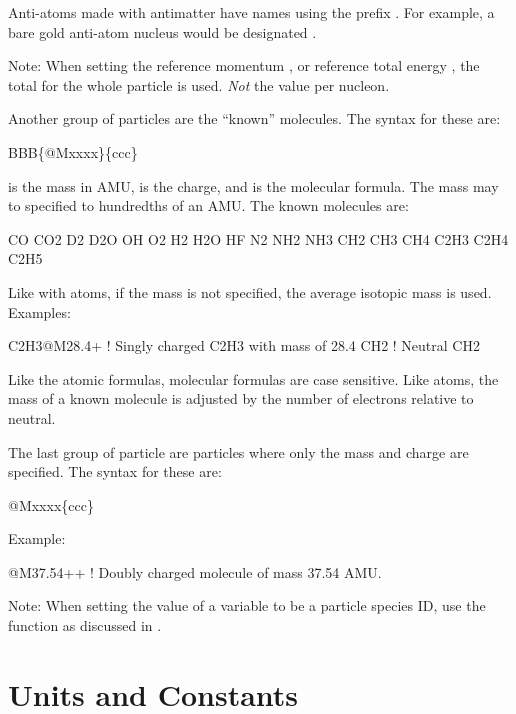 {{{{{Anti-atoms made with antimatter have names using the prefix . For example, a bare
gold anti-atom nucleus would be designated .

Note: When setting the reference momentum , or reference total energy
, the total for the whole particle is used. {\em Not} the value per nucleon.

Another group of particles are the ``known'' molecules. The syntax for these are:
\begin{example}
  BBB\{@Mxxxx\}\{ccc\}
\end{example}
 is the mass in AMU,  is the charge, and  is the molecular formula. The
mass may to specified to hundredths of an AMU. The known molecules are:
\begin{example}
  CO       CO2      
  D2       D2O      
  OH       O2      
  H2       H2O      HF
  N2       NH2      NH3      
  CH2      CH3      CH4      
  C2H3     C2H4     C2H5
\end{example}
Like with atoms, if the mass is not specified, the average isotopic mass is used. Examples:
\begin{example}
  C2H3@M28.4+     ! Singly charged C2H3 with mass of 28.4
  CH2             ! Neutral CH2
\end{example}
Like the atomic formulas, molecular formulas are case sensitive. Like atoms, the mass of a known molecule
is adjusted by the number of electrons relative to neutral.

The last group of particle are particles where only the mass and charge are specified.  The syntax
for these are:
\begin{example}
  @Mxxxx\{ccc\}
\end{example}
Example:
\begin{example}
  @M37.54++    ! Doubly charged molecule of mass 37.54 AMU.
\end{example}

Note: When setting the value of a variable to be a particle species ID, use the  function as discussed
in .

\newpage

\section{Units and Constants}
\label{s:constants}

}}}}}
